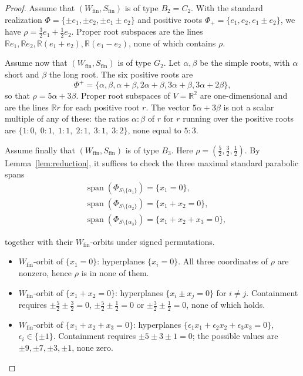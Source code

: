 \documentclass[11pt]{amsart}
\newcommand{\bbR}{\mathbb{R}}
\DeclareMathOperator{\Span}{span}
\theoremstyle{plain}
\theoremstyle{definition}
\theoremstyle{remark}
\begin{document}
	\begin{proof}
		Assume that \((W_{\mathrm{fin}}, S_{\mathrm{fin}})\)  is of type $B_2=C_2$. With the standard realization $\Phi=\{\pm e_1,\pm e_2,\pm e_1\pm e_2\}$ and positive roots $\Phi_+=\{e_1,e_2, e_1\pm e_2\}$, we have $\rho=\tfrac32 e_1 +\tfrac12 e_2$.  Proper root subspaces are the lines $\bbR e_1,\bbR e_2,\bbR(e_1+e_2),\bbR(e_1-e_2)$, none of which contains $\rho$.
		
		Assume now that \((W_{\mathrm{fin}}, S_{\mathrm{fin}})\) is of type $G_2$. Let $\alpha,\beta$ be the simple roots, with $\alpha$ short and $\beta$ the long root. 
		The six positive roots are 
		\[\Phi^+ = \{\alpha,\beta,\alpha+\beta,2\alpha+\beta,3\alpha+\beta,3\alpha+2\beta\},\]
		so that $\rho=5\alpha+3\beta$.  Proper root subspaces of $V=\bbR^2$ are
		one-dimensional and are the lines $\bbR r$ for each positive root $r$.
		The vector $5\alpha+3\beta$ is not a scalar multiple of any of these:
		the ratios $\alpha:\beta$ of $r$ for $r$ running over the positive
		roots are $\{1:0,\;0:1,\;1:1,\;2:1,\;3:1,\;3:2\}$, none equal to $5:3$.
		
		Assume finally that \((W_{\mathrm{fin}}, S_{\mathrm{fin}})\) is of type $B_3$. Here $\rho=(\tfrac52,\tfrac32,\tfrac12)$.  By Lemma~\ref{lem:reduction},
		it suffices to check the three maximal standard parabolic spans
		\begin{align}
			& \Span(\Phi_{S\setminus\{\alpha_1\}}) = \{x_1=0\}, \nonumber \\
			& \Span(\Phi_{S\setminus\{\alpha_2\}}) = \{x_1+x_2=0\}, \nonumber \\
			& \Span(\Phi_{S\setminus\{\alpha_3\}}) = \{x_1+x_2+x_3=0\}, \nonumber
		\end{align}
		
		together with their $W_{\mathrm{fin}}$-orbits under signed permutations.
		\begin{itemize}
			\item $W_{\mathrm{fin}}$-orbit of $\{x_1=0\}$: hyperplanes $\{x_i=0\}$.  All three
			coordinates of $\rho$ are nonzero, hence $\rho$ is in none of them.
			\item $W_{\mathrm{fin}}$-orbit of $\{x_1+x_2=0\}$: hyperplanes $\{x_i\pm x_j=0\}$ for
			$i\ne j$.  Containment requires
			$\pm\tfrac52\pm\tfrac32=0$, $\pm\tfrac52\pm\tfrac12=0$ or
			$\pm\tfrac32\pm\tfrac12=0$, none of which holds.
			\item $W_{\mathrm{fin}}$-orbit of $\{x_1+x_2+x_3=0\}$: hyperplanes
			$\{\epsilon_1 x_1+\epsilon_2 x_2+\epsilon_3 x_3 = 0\}$, $\epsilon_i\in\{\pm1\}$.
			Containment requires $\pm 5\pm 3\pm 1=0$; the possible values are
			$\pm9,\pm7,\pm3,\pm1$, none zero.
		\end{itemize}
	\end{proof}
	
\end{document}
